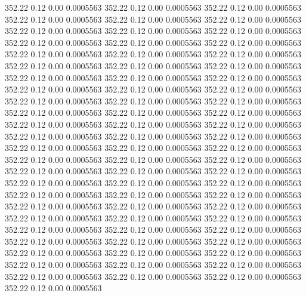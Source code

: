  352.22    0.12    0.00   0.0005563
 352.22    0.12    0.00   0.0005563
 352.22    0.12    0.00   0.0005563
 352.22    0.12    0.00   0.0005563
 352.22    0.12    0.00   0.0005563
 352.22    0.12    0.00   0.0005563
 352.22    0.12    0.00   0.0005563
 352.22    0.12    0.00   0.0005563
 352.22    0.12    0.00   0.0005563
 352.22    0.12    0.00   0.0005563
 352.22    0.12    0.00   0.0005563
 352.22    0.12    0.00   0.0005563
 352.22    0.12    0.00   0.0005563
 352.22    0.12    0.00   0.0005563
 352.22    0.12    0.00   0.0005563
 352.22    0.12    0.00   0.0005563
 352.22    0.12    0.00   0.0005563
 352.22    0.12    0.00   0.0005563
 352.22    0.12    0.00   0.0005563
 352.22    0.12    0.00   0.0005563
 352.22    0.12    0.00   0.0005563
 352.22    0.12    0.00   0.0005563
 352.22    0.12    0.00   0.0005563
 352.22    0.12    0.00   0.0005563
 352.22    0.12    0.00   0.0005563
 352.22    0.12    0.00   0.0005563
 352.22    0.12    0.00   0.0005563
 352.22    0.12    0.00   0.0005563
 352.22    0.12    0.00   0.0005563
 352.22    0.12    0.00   0.0005563
 352.22    0.12    0.00   0.0005563
 352.22    0.12    0.00   0.0005563
 352.22    0.12    0.00   0.0005563
 352.22    0.12    0.00   0.0005563
 352.22    0.12    0.00   0.0005563
 352.22    0.12    0.00   0.0005563
 352.22    0.12    0.00   0.0005563
 352.22    0.12    0.00   0.0005563
 352.22    0.12    0.00   0.0005563
 352.22    0.12    0.00   0.0005563
 352.22    0.12    0.00   0.0005563
 352.22    0.12    0.00   0.0005563
 352.22    0.12    0.00   0.0005563
 352.22    0.12    0.00   0.0005563
 352.22    0.12    0.00   0.0005563
 352.22    0.12    0.00   0.0005563
 352.22    0.12    0.00   0.0005563
 352.22    0.12    0.00   0.0005563
 352.22    0.12    0.00   0.0005563
 352.22    0.12    0.00   0.0005563
 352.22    0.12    0.00   0.0005563
 352.22    0.12    0.00   0.0005563
 352.22    0.12    0.00   0.0005563
 352.22    0.12    0.00   0.0005563
 352.22    0.12    0.00   0.0005563
 352.22    0.12    0.00   0.0005563
 352.22    0.12    0.00   0.0005563
 352.22    0.12    0.00   0.0005563
 352.22    0.12    0.00   0.0005563
 352.22    0.12    0.00   0.0005563
 352.22    0.12    0.00   0.0005563
 352.22    0.12    0.00   0.0005563
 352.22    0.12    0.00   0.0005563
 352.22    0.12    0.00   0.0005563
 352.22    0.12    0.00   0.0005563
 352.22    0.12    0.00   0.0005563
 352.22    0.12    0.00   0.0005563
 352.22    0.12    0.00   0.0005563
 352.22    0.12    0.00   0.0005563
 352.22    0.12    0.00   0.0005563
 352.22    0.12    0.00   0.0005563
 352.22    0.12    0.00   0.0005563
 352.22    0.12    0.00   0.0005563
